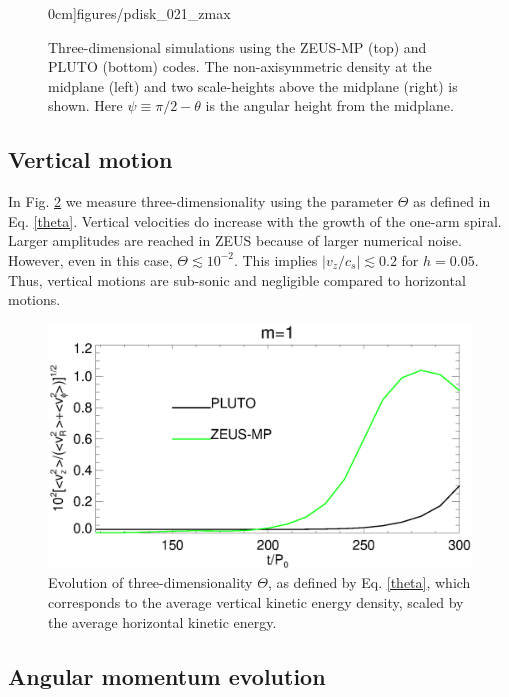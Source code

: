 \begin{figure}
\begin{center}
{      0cm]{figures/pdisk_021_zmax}
    }
  \end{center}
  \caption{Three-dimensional simulations using the ZEUS-MP (top) and 
    PLUTO (bottom) codes. The non-axisymmetric density at the midplane (left) and
    two scale-heights above the midplane (right) is shown. Here $\psi
    \equiv \pi/2 - \theta$ is the angular height  
    from the midplane.\label{3d_prelim}}   
\end{figure}

\subsection{Vertical motion}
In Fig. \ref{3d_vert} we measure three-dimensionality using the
parameter $\Theta$ as defined in Eq. \ref{theta}. Vertical velocities
do increase with the growth of the one-arm spiral. Larger amplitudes
are reached in ZEUS because of larger numerical noise. 
However, even 
in this case, $\Theta \lesssim 10^{-2}$. This implies $|v_z/c_s|\lesssim
0.2$ for $h=0.05$. Thus, vertical motions are sub-sonic and negligible
compared to horizontal motions. 

\begin{figure}
  \includegraphics[width=\linewidth]{figures/m1_analysis_plot_vert.ps}
  \caption{Evolution of three-dimensionality $\Theta$, as defined by
    Eq. \ref{theta}, which corresponds to the
    average vertical kinetic energy density, scaled by 
    the average horizontal kinetic energy.\label{3d_vert}} 
\end{figure}   

\subsection{Angular momentum evolution}


